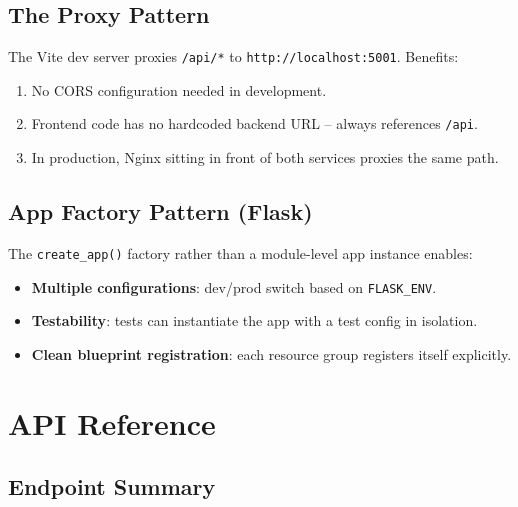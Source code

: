 \documentclass[11pt,a4paper]{article}
\begin{document}
\subsection{The Proxy Pattern}

The Vite dev server proxies \texttt{/api/*} to \texttt{http://localhost:5001}. Benefits:
\begin{enumerate}
  \item No CORS configuration needed in development.
  \item Frontend code has no hardcoded backend URL -- always references \texttt{/api}.
  \item In production, Nginx sitting in front of both services proxies the same path.
\end{enumerate}

\subsection{App Factory Pattern (Flask)}

The \texttt{create\_app()} factory rather than a module-level app instance enables:
\begin{itemize}
  \item \textbf{Multiple configurations}: dev/prod switch based on \texttt{FLASK\_ENV}.
  \item \textbf{Testability}: tests can instantiate the app with a test config in isolation.
  \item \textbf{Clean blueprint registration}: each resource group registers itself explicitly.
\end{itemize}

\newpage

\section{API Reference}

\subsection{Endpoint Summary}
\end{document}
